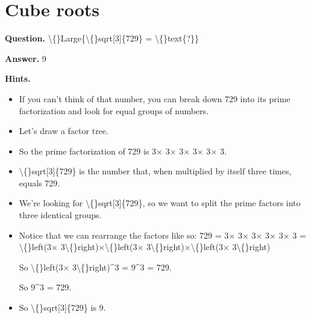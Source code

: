 \documentclass{article}
\begin{document}
\section*{Cube roots}
\textbf{Question.} \textbackslash\{\}Large\{\textbackslash\{\}sqrt[3]\{729\} = \textbackslash\{\}text\{?\}\}

\textbf{Answer.} 9

\textbf{Hints.}
\begin{itemize}
  \item If you can't think of that number, you can break down 729 into
                its prime factorization and look for equal groups of numbers.
  \item Let's draw a factor tree.
  \item So the prime factorization of 729 is 3$\times$ 3$\times$ 3$\times$ 3$\times$ 3$\times$ 3.
  \item \textbackslash\{\}sqrt[3]\{729\} is the number that, when
                        multiplied by itself three times, equals 729.
  \item We're looking for \textbackslash\{\}sqrt[3]\{729\}, so we want to split the prime factors into three identical groups.
  \item Notice that we can rearrange the factors like so:
                            729 = 3$\times$ 3$\times$ 3$\times$ 3$\times$ 3$\times$ 3 = \textbackslash\{\}left(3$\times$ 3\textbackslash\{\}right)$\times$\textbackslash\{\}left(3$\times$ 3\textbackslash\{\}right)$\times$\textbackslash\{\}left(3$\times$ 3\textbackslash\{\}right)
                        

                        
                            So \textbackslash\{\}left(3$\times$ 3\textbackslash\{\}right)\textasciicircum{}3 = 9\textasciicircum{}3 = 729.
                        
                            So 9\textasciicircum{}3 = 729.
  \item So \textbackslash\{\}sqrt[3]\{729\} is 9.
\end{itemize}
\end{document}
